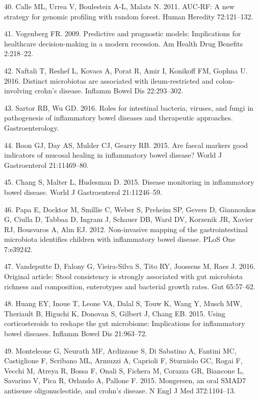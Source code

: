 \documentclass[12pt,]{article}
\begin{document}
\hypertarget{ref-calle_aucrf_2011}{}
40. Calle ML, Urrea V, Boulesteix A-L, Malats N. 2011. AUC-RF: A new
strategy for genomic profiling with random forest. Human Heredity
72:121--132.

\hypertarget{ref-Vogenberg_progmods_2009}{}
41. Vogenberg FR. 2009. Predictive and prognostic models: Implications
for healthcare decision-making in a modern recession. Am Health Drug
Benefits 2:218--22.

\hypertarget{ref-naftali_tissinvol_2016}{}
42. Naftali T, Reshef L, Kovacs A, Porat R, Amir I, Konikoff FM, Gophna
U. 2016. Distinct microbiotas are associated with ileum-restricted and
colon-involving crohn's disease. Inflamm Bowel Dis 22:293--302.

\hypertarget{ref-sartor_microbesIBD_2016}{}
43. Sartor RB, Wu GD. 2016. Roles for intestinal bacteria, viruses, and
fungi in pathogenesis of inflammatory bowel diseases and therapeutic
approaches. Gastroenterology.

\hypertarget{ref-boon_fmarkers_2015}{}
44. Boon GJ, Day AS, Mulder CJ, Gearry RB. 2015. Are faecal markers good
indicators of mucosal healing in inflammatory bowel disease? World J
Gastroenterol 21:11469--80.

\hypertarget{ref-chang_monitoring_2015}{}
45. Chang S, Malter L, Hudesman D. 2015. Disease monitoring in
inflammatory bowel disease. World J Gastroenterol 21:11246--59.

\hypertarget{ref-papa_pedsIBD_2012}{}
46. Papa E, Docktor M, Smillie C, Weber S, Preheim SP, Gevers D,
Giannoukos G, Ciulla D, Tabbaa D, Ingram J, Schauer DB, Ward DV,
Korzenik JR, Xavier RJ, Bousvaros A, Alm EJ. 2012. Non-invasive mapping
of the gastrointestinal microbiota identifies children with inflammatory
bowel disease. PLoS One 7:e39242.

\hypertarget{ref-vandeputte_stoolcon_2016}{}
47. Vandeputte D, Falony G, Vieira-Silva S, Tito RY, Joossens M, Raes J.
2016. Original article: Stool consistency is strongly associated with
gut microbiota richness and composition, enterotypes and bacterial
growth rates. Gut 65:57--62.

\hypertarget{ref-huang_cort_2015}{}
48. Huang EY, Inoue T, Leone VA, Dalal S, Touw K, Wang Y, Musch MW,
Theriault B, Higuchi K, Donovan S, Gilbert J, Chang EB. 2015. Using
corticosteroids to reshape the gut microbiome: Implications for
inflammatory bowel diseases. Inflamm Bowel Dis 21:963--72.

\hypertarget{ref-monteleone_mongersen_2015}{}
49. Monteleone G, Neurath MF, Ardizzone S, Di Sabatino A, Fantini MC,
Castiglione F, Scribano ML, Armuzzi A, Caprioli F, Sturniolo GC, Rogai
F, Vecchi M, Atreya R, Bossa F, Onali S, Fichera M, Corazza GR, Biancone
L, Savarino V, Pica R, Orlando A, Pallone F. 2015. Mongersen, an oral
SMAD7 antisense oligonucleotide, and crohn's disease. N Engl J Med
372:1104--13.
\end{document}
